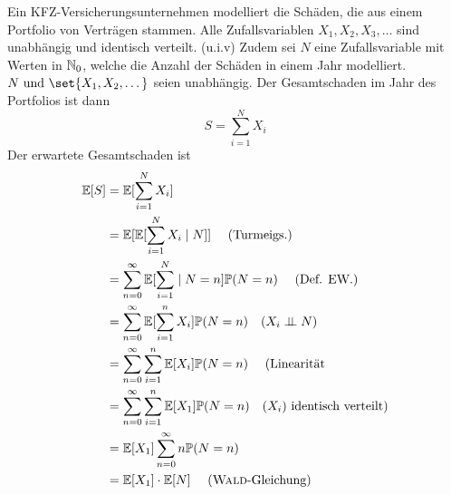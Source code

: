 \begin{example}
	Ein KFZ-Versicherungsunternehmen modelliert die Schäden, die aus einem Portfolio von Verträgen stammen. Alle Zufallsvariablen $X_1,X_2,X_3,\dots$ sind unabhängig und identisch verteilt. (u.i.v) Zudem sei $N$ eine Zufallsvariable mit Werten in $\mathbb{N}_0$, welche die Anzahl der Schäden in einem Jahr modelliert. $N \und \set{X_1, X_2, \dots}$ seien unabhängig. Der Gesamtschaden im Jahr des Portfolios ist dann
	\[
		S = \sum_{i=1}^N X_i
	\]
	Der erwartete Gesamtschaden ist
	\begin{align*} %
		\E[S] &= \E[\sum_{i=1}^N X_i]\\
		&=\E[\E[\sum_{i=1}^N X_i \mid N]] \quad \text{ (Turmeigs.)}\\
		&= \sum_{n=0}^{\infty} \E[\sum_{i=1}^N \mid N = n]\P(N=n) \quad\text{ (Def. EW.)}\\
		&= \sum_{n=0}^{\infty} \E[\sum_{i=1}^n X_i]\P(N=n) \quad \text{(}X_i \upmodels N\text{)}\\
		&= \sum_{n=0}^{\infty}\sum_{i=1}^n \E[X_i]\P(N=n) \quad \text{ (Linearität}\\
		&= \sum_{n=0}^{\infty}\sum_{i=1}^n \E[X_1]\P(N=n) \quad \text{($X_i)$ identisch verteilt)}\\
		&= \E[X_1] \sum_{n=0}^{\infty} n \P(N=n)\\
		&= \E[X_1]\cdot \E[N] \quad \text{ (\person{Wald}-Gleichung)}
	\end{align*}
\end{example}
